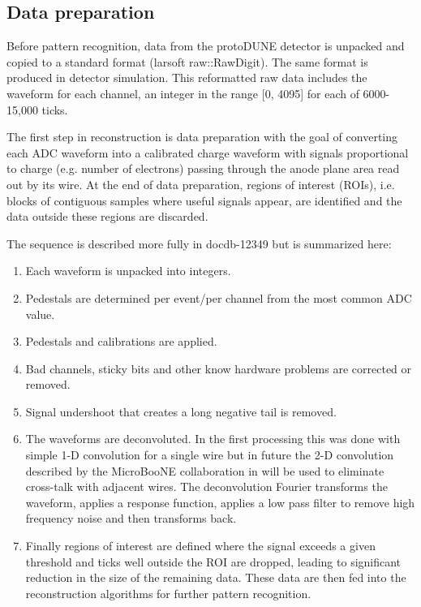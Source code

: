 \subsection{Data preparation}

Before pattern recognition, data from the protoDUNE detector is
unpacked and copied to a standard format (larsoft raw::RawDigit).
The same format is produced in detector simulation.
This reformatted raw data includes the waveform for each channel, an
integer in the range [0, 4095] for each of 6000-15,000 ticks.

The first step in reconstruction is data preparation with the goal of
converting each ADC waveform into a calibrated charge waveform with
signals proportional to charge (e.g. number of electrons) passing through
the anode plane area read out by its wire.
At the end of data preparation, regions of interest (ROIs), i.e. blocks of contiguous samples where
useful signals appear, are identified and the data outside these regions are discarded.


The sequence is described more fully in docdb-12349\cite{ref:docdb12349} but is summarized here:

\begin{enumerate}
\item Each waveform is unpacked into integers.
\item Pedestals are determined per event/per channel from the most common ADC value. 
\item Pedestals and calibrations are applied. %
\item Bad channels, sticky bits and other know hardware problems are corrected or removed.
\item Signal undershoot that creates a long negative tail is removed. 
\item The waveforms  are deconvoluted.  In the first processing this was done with simple 1-D convolution for a single wire but in future the 2-D convolution described by the MicroBooNE collaboration in \cite{Adams:2018dra} will be used to eliminate cross-talk with adjacent wires.  The deconvolution Fourier transforms the waveform, applies a response function, applies a low pass filter to remove high frequency noise and then transforms back.



\item Finally regions of interest are defined where the signal exceeds a given threshold and ticks well outside the ROI are dropped, leading to significant reduction in the size of the remaining data. These data are then fed into the reconstruction algorithms for further pattern recognition. %
\end{enumerate}




